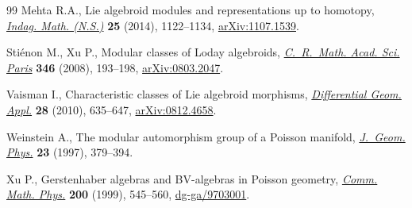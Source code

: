 \documentclass[pdftex]{sigma}
\numberwithin{equation}{section}
\newcommand{\8}{\infty}
\begin{document}
\begin{thebibliography}{99}
Mehta R.A., Lie algebroid modules and representations up to homotopy,
 \href{https://doi.org/10.1016/j.indag.2014.07.013}{\textit{Indag. Math. (N.S.)}} \textbf{25} (2014), 1122--1134,
 \href{https://arxiv.org/abs/1107.1539}{arXiv:1107.1539}.

Sti\'{e}non M., Xu P., Modular classes of {L}oday algebroids,
 \href{https://doi.org/10.1016/j.crma.2007.12.012}{\textit{C.~R.~Math. Acad. Sci. Paris}} \textbf{346} (2008), 193--198,
 \href{https://arxiv.org/abs/0803.2047}{arXiv:0803.2047}.

Vaisman I., Characteristic classes of {L}ie algebroid morphisms,
 \href{https://doi.org/10.1016/j.difgeo.2010.01.001}{\textit{Differential Geom. Appl.}} \textbf{28} (2010), 635--647,
 \href{https://arxiv.org/abs/0812.4658}{arXiv:0812.4658}.

Weinstein A., The modular automorphism group of a {P}oisson manifold,
 \href{https://doi.org/10.1016/S0393-0440(97)80011-3}{\textit{J.~Geom. Phys.}} \textbf{23} (1997), 379--394.

Xu P., Gerstenhaber algebras and {BV}-algebras in {P}oisson geometry,
 \href{https://doi.org/10.1007/s002200050540}{\textit{Comm. Math. Phys.}} \textbf{200} (1999), 545--560,
 \href{https://arxiv.org/abs/dg-ga/9703001}{dg-ga/9703001}.

\end{thebibliography}\LastPageEnding
\end{document}
